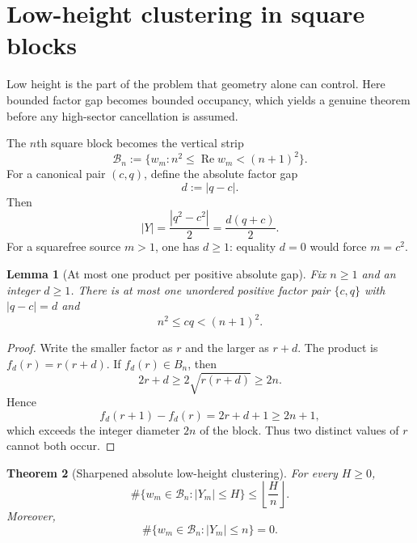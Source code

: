 \documentclass[11pt]{article}
\newtheorem{theorem}{Theorem}[section]
\newtheorem{lemma}[theorem]{Lemma}
\theoremstyle{definition}
\newcommand{\1}{\mathbf{1}}
\newcommand{\Repart}{\operatorname{Re}}
\begin{document}
\section{Low-height clustering in square blocks}
\label{sec:clustering}

Low height is the part of the problem that geometry alone can control.  Here bounded factor gap becomes bounded occupancy, which yields a genuine theorem before any high-sector cancellation is assumed.

The $n$th square block becomes the vertical strip
\begin{equation}
 \mathscr B_n
 :=\{w_m:n^2\le\Repart w_m<(n+1)^2\}.
 \label{eq:complex-block}
\end{equation}
For a canonical pair $(c,q)$, define the absolute factor gap
\begin{equation}
 d:=|q-c|.
 \label{eq:absolute-gap}
\end{equation}
Then
\begin{equation}
 |Y|
 =\frac{|q^2-c^2|}{2}
 =\frac{d(q+c)}{2}.
 \label{eq:Y-absolute-gap}
\end{equation}
For a squarefree source $m>1$, one has $d\ge1$: equality $d=0$ would force $m=c^2$.

\begin{lemma}[At most one product per positive absolute gap]
\label{lem:one-product-gap}
Fix $n\ge1$ and an integer $d\ge1$.  There is at most one unordered positive factor pair $\{c,q\}$ with $|q-c|=d$ and
\begin{equation}
 n^2\le cq<(n+1)^2.
 \label{eq:gap-block-condition}
\end{equation}
\end{lemma}

\begin{proof}
Write the smaller factor as $r$ and the larger as $r+d$.  The product is $f_d(r)=r(r+d)$.  If $f_d(r)\in B_n$, then
\[
 2r+d\ge2\sqrt{r(r+d)}\ge2n.
\]
Hence
\[
 f_d(r+1)-f_d(r)=2r+d+1\ge2n+1,
\]
which exceeds the integer diameter $2n$ of the block.  Thus two distinct values of $r$ cannot both occur.
\end{proof}

\begin{theorem}[Sharpened absolute low-height clustering]
\label{thm:absolute-clustering}
For every $H\ge0$,
\begin{equation}
 \boxed{
 \#\{w_m\in\mathscr B_n:|Y_m|\le H\}
 \le
 \left\lfloor\frac{H}{n}\right\rfloor.
 }
 \label{eq:absolute-clustering}
\end{equation}
Moreover,
\begin{equation}
 \boxed{
 \#\{w_m\in\mathscr B_n:|Y_m|\le n\}=0.
 }
 \label{eq:no-height-n-points}
\end{equation}
\end{theorem}
\end{document}
